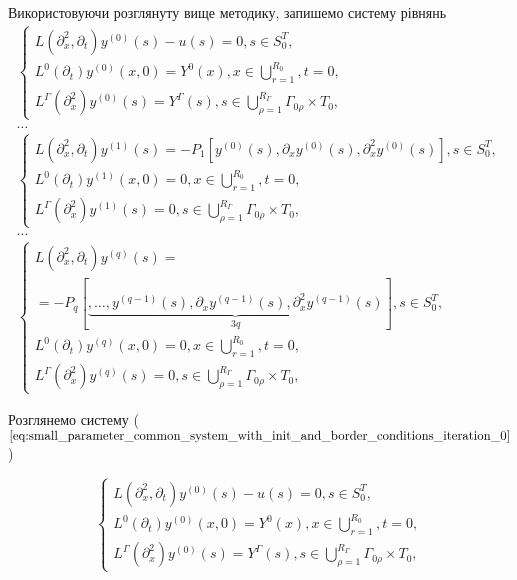 Використовуючи розглянуту вище методику, запишемо систему рівнянь
\begin{gather*}
    \left\{
        \begin{alignedat}{2}
            L(\partial_x^2, \partial_t)y^{(0)}(s) - u(s) = 0, s\in S_{0}^T, \\
            L^{0}(\partial_{t})y^{(0)}(x, 0) = Y^{0}(x), x\in\bigcup\limits_{r=1}^{R_{0}},t=0,\\
            L^{\Gamma}(\partial^{2}_{x})y^{(0)}(s) = Y^{\Gamma}(s),s\in\bigcup\limits_{\rho=1}^{R_{\Gamma}} \Gamma_{0\rho}\times T_{0},
        \end{alignedat}
    \right.\\
    \dots\\
    \left\{
        \begin{alignedat}{2}
            L(\partial_x^2, \partial_t)y^{(1)}(s) = - P_{1}\left[
                y^{(0)}(s), \partial_x y^{(0)}(s), \partial_x^2 y^{(0)}(s)
            \right], s\in S_{0}^T, \\
            L^{0}(\partial_{t})y^{(1)}(x, 0) = 0, x\in\bigcup\limits_{r=1}^{R_{0}},t=0,\\
            L^{\Gamma}(\partial^{2}_{x})y^{(1)}(s) = 0,s\in\bigcup\limits_{\rho=1}^{R_{\Gamma}} \Gamma_{0\rho}\times T_{0},
        \end{alignedat}
    \right.\\
    \dots\\
    \left\{
        \begin{alignedat}{2}
            L(\partial_x^2, \partial_t)y^{(q)}(s) = \\
            = - P_{q}\left[
                         \underbrace{
                             ,\dots,
                             y^{(q-1)}(s), \partial_x y^{(q-1)}(s), \partial_x^2 y^{(q-1)}(s)
                         }_{3q}
            \right], s\in S_{0}^T, \\
            L^{0}(\partial_{t})y^{(q)}(x, 0) = 0, x\in\bigcup\limits_{r=1}^{R_{0}},t=0,\\
            L^{\Gamma}(\partial^{2}_{x})y^{(q)}(s) = 0,s\in\bigcup\limits_{\rho=1}^{R_{\Gamma}} \Gamma_{0\rho}\times T_{0},
        \end{alignedat}
    \right.
\end{gather*}


Розглянемо систему ($\ref{eq:small_parameter_common_system_with_init_and_border_conditions_iteration_0}$)

\begin{equation}
    \label{eq:small_parameter_common_system_with_init_and_border_conditions_iteration_0}
    \left\{
        \begin{alignedat}{2}
            L(\partial_x^2, \partial_t)y^{(0)}(s) - u(s) = 0, s\in S_{0}^T, \\
            L^{0}(\partial_{t})y^{(0)}(x, 0) = Y^{0}(x), x\in\bigcup\limits_{r=1}^{R_{0}},t=0,\\
            L^{\Gamma}(\partial^{2}_{x})y^{(0)}(s) = Y^{\Gamma}(s),s\in\bigcup\limits_{\rho=1}^{R_{\Gamma}} \Gamma_{0\rho}\times T_{0},
        \end{alignedat}
    \right.
\end{equation}

